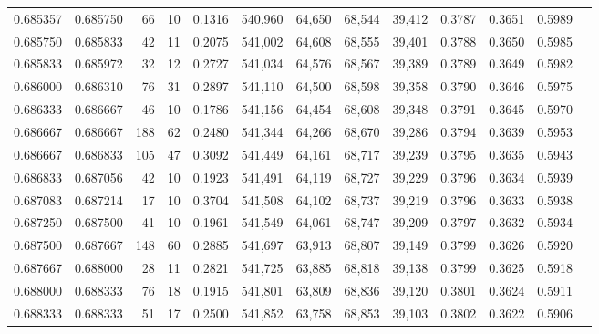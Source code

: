 \begin{tabular}{rrrrrrrrrrrrr}
0.685357 & 0.685750 &    66 &  10 &                                     0.1316 & 540,960 &  64,650 &  68,544 &  39,412 & 0.3787 & 0.3651 & 0.5989 \\
0.685750 & 0.685833 &    42 &  11 &                                     0.2075 & 541,002 &  64,608 &  68,555 &  39,401 & 0.3788 & 0.3650 & 0.5985 \\
0.685833 & 0.685972 &    32 &  12 &                                     0.2727 & 541,034 &  64,576 &  68,567 &  39,389 & 0.3789 & 0.3649 & 0.5982 \\
0.686000 & 0.686310 &    76 &  31 &                                     0.2897 & 541,110 &  64,500 &  68,598 &  39,358 & 0.3790 & 0.3646 & 0.5975 \\
0.686333 & 0.686667 &    46 &  10 &                                     0.1786 & 541,156 &  64,454 &  68,608 &  39,348 & 0.3791 & 0.3645 & 0.5970 \\
0.686667 & 0.686667 &   188 &  62 &                                     0.2480 & 541,344 &  64,266 &  68,670 &  39,286 & 0.3794 & 0.3639 & 0.5953 \\
0.686667 & 0.686833 &   105 &  47 &                                     0.3092 & 541,449 &  64,161 &  68,717 &  39,239 & 0.3795 & 0.3635 & 0.5943 \\
0.686833 & 0.687056 &    42 &  10 &                                     0.1923 & 541,491 &  64,119 &  68,727 &  39,229 & 0.3796 & 0.3634 & 0.5939 \\
0.687083 & 0.687214 &    17 &  10 &                                     0.3704 & 541,508 &  64,102 &  68,737 &  39,219 & 0.3796 & 0.3633 & 0.5938 \\
0.687250 & 0.687500 &    41 &  10 &                                     0.1961 & 541,549 &  64,061 &  68,747 &  39,209 & 0.3797 & 0.3632 & 0.5934 \\
0.687500 & 0.687667 &   148 &  60 &                                     0.2885 & 541,697 &  63,913 &  68,807 &  39,149 & 0.3799 & 0.3626 & 0.5920 \\
0.687667 & 0.688000 &    28 &  11 &                                     0.2821 & 541,725 &  63,885 &  68,818 &  39,138 & 0.3799 & 0.3625 & 0.5918 \\
0.688000 & 0.688333 &    76 &  18 &                                     0.1915 & 541,801 &  63,809 &  68,836 &  39,120 & 0.3801 & 0.3624 & 0.5911 \\
0.688333 & 0.688333 &    51 &  17 &                                     0.2500 & 541,852 &  63,758 &  68,853 &  39,103 & 0.3802 & 0.3622 & 0.5906 \\

\end{tabular}
